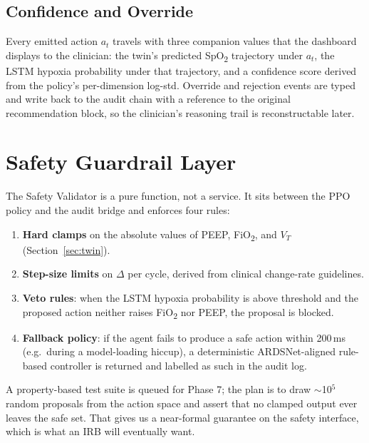 \documentclass[conference]{IEEEtran}
\begin{document}
\subsection{Confidence and Override}
Every emitted action $a_t$ travels with three companion values that the dashboard displays to the clinician: the twin's predicted SpO\textsubscript{2} trajectory under $a_t$, the LSTM hypoxia probability under that trajectory, and a confidence score derived from the policy's per-dimension log-std. Override and rejection events are typed and write back to the audit chain with a reference to the original recommendation block, so the clinician's reasoning trail is reconstructable later.

\section{Safety Guardrail Layer}
\label{sec:safety}

The Safety Validator is a pure function, not a service. It sits between the PPO policy and the audit bridge and enforces four rules:
\begin{enumerate}
  \item \textbf{Hard clamps} on the absolute values of PEEP, FiO\textsubscript{2}, and $V_T$ (Section~\ref{sec:twin}).
  \item \textbf{Step-size limits} on $\Delta$ per cycle, derived from clinical change-rate guidelines.
  \item \textbf{Veto rules}: when the LSTM hypoxia probability is above threshold and the proposed action neither raises FiO\textsubscript{2} nor PEEP, the proposal is blocked.
  \item \textbf{Fallback policy}: if the agent fails to produce a safe action within 200\,ms (e.g.\ during a model-loading hiccup), a deterministic ARDSNet-aligned rule-based controller is returned and labelled as such in the audit log.
\end{enumerate}

A property-based test suite is queued for Phase 7; the plan is to draw $\sim$10$^5$ random proposals from the action space and assert that no clamped output ever leaves the safe set. That gives us a near-formal guarantee on the safety interface, which is what an IRB will eventually want.

\end{document}
